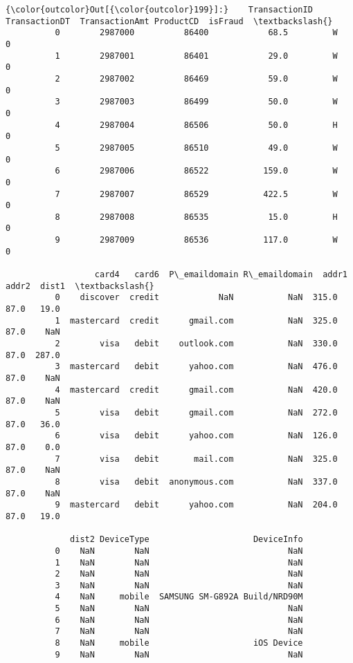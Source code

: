 \documentclass[11pt]{article}
\begin{document}
\begin{Verbatim}[commandchars=\\\{\}]
{\color{outcolor}Out[{\color{outcolor}199}]:}    TransactionID  TransactionDT  TransactionAmt ProductCD  isFraud  \textbackslash{}
          0        2987000          86400            68.5         W        0   
          1        2987001          86401            29.0         W        0   
          2        2987002          86469            59.0         W        0   
          3        2987003          86499            50.0         W        0   
          4        2987004          86506            50.0         H        0   
          5        2987005          86510            49.0         W        0   
          6        2987006          86522           159.0         W        0   
          7        2987007          86529           422.5         W        0   
          8        2987008          86535            15.0         H        0   
          9        2987009          86536           117.0         W        0   
          
                  card4   card6  P\_emaildomain R\_emaildomain  addr1  addr2  dist1  \textbackslash{}
          0    discover  credit            NaN           NaN  315.0   87.0   19.0   
          1  mastercard  credit      gmail.com           NaN  325.0   87.0    NaN   
          2        visa   debit    outlook.com           NaN  330.0   87.0  287.0   
          3  mastercard   debit      yahoo.com           NaN  476.0   87.0    NaN   
          4  mastercard  credit      gmail.com           NaN  420.0   87.0    NaN   
          5        visa   debit      gmail.com           NaN  272.0   87.0   36.0   
          6        visa   debit      yahoo.com           NaN  126.0   87.0    0.0   
          7        visa   debit       mail.com           NaN  325.0   87.0    NaN   
          8        visa   debit  anonymous.com           NaN  337.0   87.0    NaN   
          9  mastercard   debit      yahoo.com           NaN  204.0   87.0   19.0   
          
             dist2 DeviceType                     DeviceInfo  
          0    NaN        NaN                            NaN  
          1    NaN        NaN                            NaN  
          2    NaN        NaN                            NaN  
          3    NaN        NaN                            NaN  
          4    NaN     mobile  SAMSUNG SM-G892A Build/NRD90M  
          5    NaN        NaN                            NaN  
          6    NaN        NaN                            NaN  
          7    NaN        NaN                            NaN  
          8    NaN     mobile                     iOS Device  
          9    NaN        NaN                            NaN  
\end{Verbatim}
            
\end{document}
